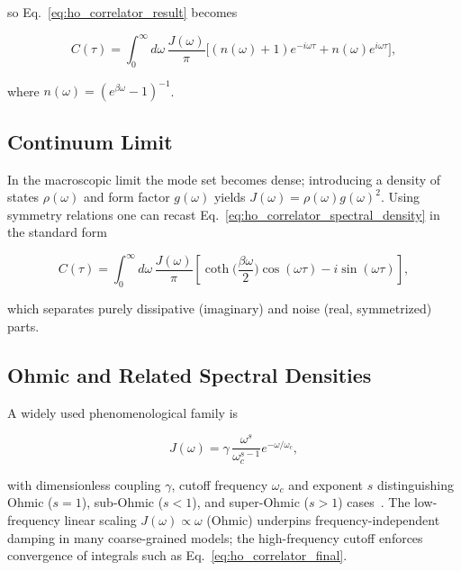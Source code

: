 \noindent
so Eq.~\eqref{eq:ho_correlator_result} becomes

\begin{equation} \label{eq:ho_correlator_spectral_density}
	C(\tau) = \int_{0}^{\infty} d\omega \, \frac{J(\omega)}{\pi} \Big[(n(\omega)+1)e^{-i \omega \tau} + n(\omega) e^{i \omega \tau}\Big],
\end{equation}

\noindent
where $n(\omega)= (e^{\beta \omega}-1)^{-1}$.


\subsection{Continuum Limit}
\label{subsec:continuum_limit}

\noindent
In the macroscopic limit the mode set becomes dense; introducing a density of states $\rho(\omega)$ and form factor $g(\omega)$ yields $J(\omega)=\rho(\omega) g(\omega)^2$. Using symmetry relations one can recast Eq.~\eqref{eq:ho_correlator_spectral_density} in the standard form

\begin{equation} \label{eq:ho_correlator_final}
	C(\tau) = \int_{0}^{\infty} d\omega \, \frac{J(\omega)}{\pi} \left[ \coth\Big(\frac{\beta \omega}{2}\Big) \cos(\omega \tau) - i \sin(\omega \tau) \right],
\end{equation}

\noindent
which separates purely dissipative (imaginary) and noise (real, symmetrized) parts.


\subsection{Ohmic and Related Spectral Densities}
\label{subsec:ohmic_spectral_density}

\noindent
A widely used phenomenological family is

\begin{equation} \label{eq:ho_ohmic_spectral_density}
	J(\omega) = \gamma \, \frac{\omega^{s}}{\omega_c^{s-1}} e^{-\omega/\omega_c},
\end{equation}

\noindent
with dimensionless coupling $\gamma$, cutoff frequency $\omega_c$ and exponent $s$ distinguishing Ohmic ($s=1$), sub-Ohmic ($s<1$), and super-Ohmic ($s>1$) cases~\cite{weiss2012quantumdissipativesystems, lambertetal2024qutip5quantum}. The low-frequency linear scaling $J(\omega) \propto \omega$ (Ohmic) underpins frequency-independent damping in many coarse-grained models; the high-frequency cutoff enforces convergence of integrals such as Eq.~\eqref{eq:ho_correlator_final}.

